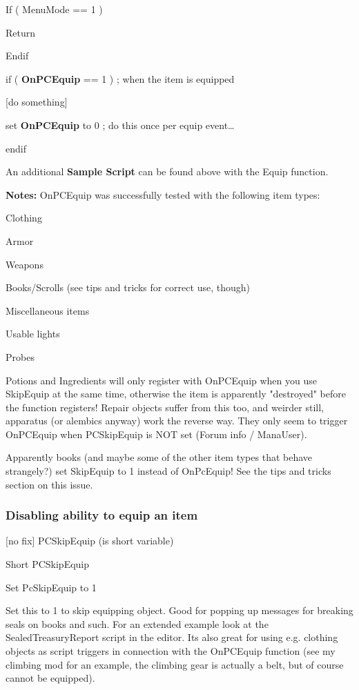 \documentclass[
]{article}
\begin{document}
If ( MenuMode == 1 )

Return

Endif

if ( \textbf{OnPCEquip} == 1 ) ; when the item is equipped

{[}do something{]}

set \textbf{OnPCEquip} to 0 ; do this once per equip event\ldots{}

endif

An additional \textbf{Sample Script} can be found above with the Equip
function.

\textbf{Notes:} OnPCEquip was successfully tested with the following
item types:

Clothing

Armor

Weapons

Books/Scrolls (see tips and tricks for correct use, though)

Miscellaneous items

Usable lights

Probes

Potions and Ingredients will only register with OnPCEquip when you use
SkipEquip at the same time, otherwise the item is apparently "destroyed"
before the function registers! Repair objects suffer from this too, and
weirder still, apparatus (or alembics anyway) work the reverse way. They
only seem to trigger OnPCEquip when PCSkipEquip is NOT set (Forum info /
ManaUser).

Apparently books (and maybe some of the other item types that behave
strangely?) set SkipEquip to 1 instead of OnPcEquip! See the tips and
tricks section on this issue.

\hypertarget{disabling-ability-to-equip-an-item}{%
\subsubsection{Disabling ability to equip an
item}\label{disabling-ability-to-equip-an-item}}

{[}no fix{]} PCSkipEquip (is short variable)

Short PCSkipEquip

Set PcSkipEquip to 1

Set this to 1 to skip equipping object. Good for popping up messages for
breaking seals on books and such. For an extended example look at the
SealedTreasuryReport script in the editor. Its also great for using e.g.
clothing objects as script triggers in connection with the OnPCEquip
function (see my climbing mod for an example, the climbing gear is
actually a belt, but of course cannot be equipped).
\end{document}
